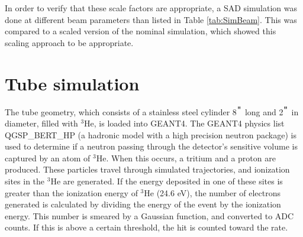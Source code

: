 In order to verify that these scale factors are appropriate, a SAD simulation was done at different beam parameters than listed in Table \ref{tab:SimBeam}. This was compared to a scaled version of the nominal simulation, which showed this scaling approach to be appropriate.



\section{\He Tube simulation}

	The \he tube geometry, which consists of a stainless steel cylinder 8$^{\verb+"+}$ long and 2$^{\verb+"+}$ in diameter, filled with $^3$He, is loaded into GEANT4. The GEANT4 physics list QGSP\_BERT\_HP (a hadronic model with a high precision neutron package) is used to determine if a neutron passing through the detector's sensitive volume is captured by an atom of $^3$He. When this occurs, a tritium and a proton are produced. These particles travel through simulated trajectories, and ionization sites in the $^3$He are generated. If the energy deposited in one of these sites is greater than the ionization energy of $^3$He (24.6 eV), the number of electrons generated is calculated by dividing the energy of the event by the ionization energy. This number is smeared by a Gaussian function, and converted to ADC counts. If this is above a certain threshold, the hit is counted toward the rate. 




















